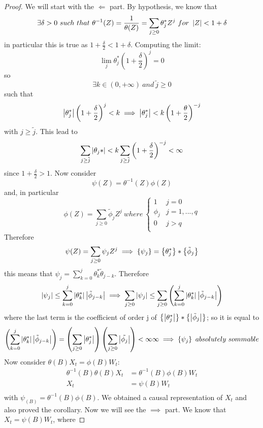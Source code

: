 \begin{proof}
    We will start with the $\Leftarrow$ part. By hypothesis, we know that
    \[
        \exists\delta>0\ such\ that\ \theta^{-1}(Z)=\frac{1}{\theta(Z)}=\sum_{j\ge0}\theta_j^*Z^j\ for\ \abs{Z}<1+\delta  
    \]
    in particular this is true as $1+\frac{\delta}{2}<1+\delta$. Computing the limit:
    \[
        \lim_j\theta_j^*(1+\frac{\delta}{2})^j=0  
    \]
    so
    \[
        \exists k\in(0,+\infty)\ and\ \tilde{j}\ge0  
    \]
    such that
    \[
        \left|\theta_j^*\right|\left(1+\frac{\delta}{2}\right)^j<k\implies\left|\theta_j^*\right|<k\left(1+\frac{\theta}{2}\right)^{-j}  
    \]
    with $j\ge\tilde{j}$. This lead to
    \[
        \sum_{j\ge\tilde{j}}\left|\theta_j*\right|<k\sum_{j\ge\tilde{j}}\left(1+\frac{\delta}{2}\right)^{-j}<\infty
    \]
    since $1+\frac{\delta}{2}>1$. Now consider
    \[
        \psi(Z)=\theta^{-1}(Z)\phi(Z)  
    \]
    and, in particular
    \[
        \phi(Z)=\sum_{j\ge0}\tilde{\phi}_jZ^j\ where\ 
        \begin{cases}
            1&j=0\\
            \phi_j&j=1,...,q\\
            0&j>q\\
        \end{cases}
    \]
    Therefore
    \[
        \psi(Z)=\sum_{j\ge0}\psi_jZ^j\implies\left\{\psi_j\right\}=\left\{\theta_j^*\right\}*\left\{\tilde{\phi}_j\right\}
    \]
    this means that $\psi_j=\sum_{k=0}^j\theta_k^*\tilde{\theta}_{j-k}$. Therefore
    \[
        \left|\psi_j\right|\le\sum_{k=0}^j\left|\theta_k^*\right|\left|\tilde{\phi}_{j-k}\right|\implies\sum_{j\ge0}\left|\psi_j\right|\le\sum_{j\ge0}\left(\sum_{k=0}^j\left|\theta_k^*\right|\left|\tilde{\phi}_{j-k}\right|\right) 
    \]
    where the last term is the coefficient of order j of $\left\{\left|\theta_j^*\right|\right\}*\left\{\left|\tilde{\phi}_j\right|\right\}$; so it is equal to
    \[
        \left(\sum_{k=0}^j\abs{\theta_k^*}\abs{\tilde{\phi}_{j-k}}\right)=\left(\sum_{j\ge0}\abs{\theta_j^*}\right)\left(\sum_{j\ge0}\abs{\tilde{\phi_j}}\right)<\infty\infty\implies\set{\psi_j}\ absolutely\ sommable
    \]
    Now consider $\theta(B)X_t=\phi(B)W_t$:
    \begin{equation*}
        \begin{split}
            \theta^{-1}(B)\theta(B)X_t&=\theta^{-1}(B)\phi(B)W_t\\
            X_t&=\psi(B)W_t\\
        \end{split}
    \end{equation*}
    with $\psi_(B)=\theta^{-1}(B)\phi(B)$. We obtained a causal representation of $X_t$ and also proved the corollary. Now we will see the $\implies$ part. We know that $X_t=\psi(B)W_t$, where

\end{proof}
